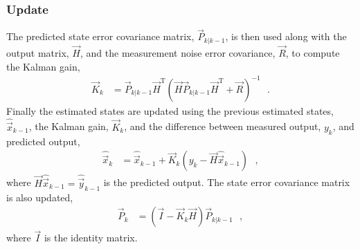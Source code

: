 \subsubsection{Update}
The predicted state error covariance matrix, $\vec{P}_{k|k-1}$, is then used along with the output matrix, $\vec{H}$, and the measurement noise error covariance, $\vec{R}$, to compute the Kalman gain,
\begin{align}
\vec{K}_k &= \vec{P}_{k|k-1} \vec{H}^\mathrm{T} ( \vec{H} \vec{P}_{k|k-1} \vec{H}^\mathrm{T} + \vec{R} )^{-1}  \ \ \ . \label{eq:kalmanGain}
\end{align}
Finally the estimated states are updated using the previous estimated states, $\hat{\vec{x}}_{k-1}$, the Kalman gain, $ \vec{K}_k$, and the difference between measured output, $y_k$, and predicted output,
\begin{align}
\hat{\vec{x}}_k &= \hat{\vec{x}}_{k-1} + \vec{K}_k ( y_k - \vec{H} \hat{\vec{x}}_{k-1} ) \ \ \ , \label{eq:estimatedState}
\end{align}
where $\vec{H} \hat{\vec{x}}_{k-1} = \hat{\vec{y}}_{k-1}$ is the predicted output. The state error covariance matrix is also updated,
%
\begin{align}
\vec{P}_k &= ( \vec{I} - \vec{K}_k \vec{H} ) \vec{P}_{k|k-1} \ \ \ , \label{eq:stateErrorCovariance}
\end{align}
where $\vec{I}$ is the identity matrix.

